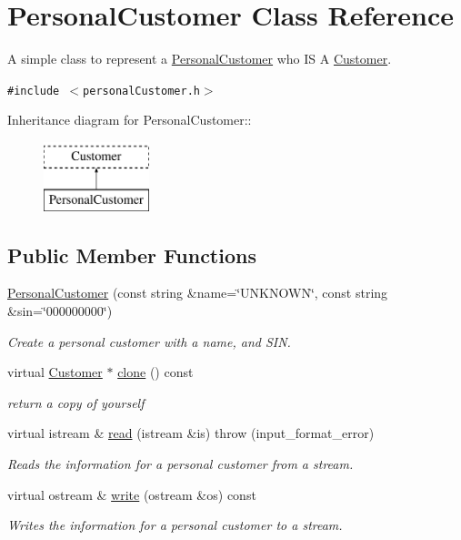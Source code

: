 \hypertarget{classPersonalCustomer}{
\section{PersonalCustomer Class Reference}
\label{classPersonalCustomer}
}
A simple class to represent a \hyperlink{classPersonalCustomer}{PersonalCustomer} who IS A \hyperlink{classCustomer}{Customer}.  


{\tt \#include $<$personalCustomer.h$>$}

Inheritance diagram for PersonalCustomer::\begin{figure}[H]
\begin{center}
\leavevmode
\includegraphics[height=2cm]{classPersonalCustomer}
\end{center}
\end{figure}
\subsection*{Public Member Functions}
\begin{CompactItemize}
\item 
\hyperlink{classPersonalCustomer_a85bdbac31d8424ff81a44d803fbec53}{PersonalCustomer} (const string \&name=\char`\"{}UNKNOWN\char`\"{}, const string \&sin=\char`\"{}000000000\char`\"{})
\begin{CompactList}\small\item\em Create a personal customer with a name, and SIN. \item\end{CompactList}\item 
virtual \hyperlink{classCustomer}{Customer} $\ast$ \hyperlink{classPersonalCustomer_a1e9e9e14356c0ff7a3d97c999e44388}{clone} () const 
\begin{CompactList}\small\item\em return a copy of yourself \item\end{CompactList}\item 
virtual istream \& \hyperlink{classPersonalCustomer_81861fd3353273de8c4da5f273ecfd26}{read} (istream \&is)  throw (input\_\-format\_\-error)
\begin{CompactList}\small\item\em Reads the information for a personal customer from a stream. \item\end{CompactList}\item 
virtual ostream \& \hyperlink{classPersonalCustomer_123975841172a6933c0358907d29f495}{write} (ostream \&os) const 
\begin{CompactList}\small\item\em Writes the information for a personal customer to a stream. \item\end{CompactList}\end{CompactItemize}


